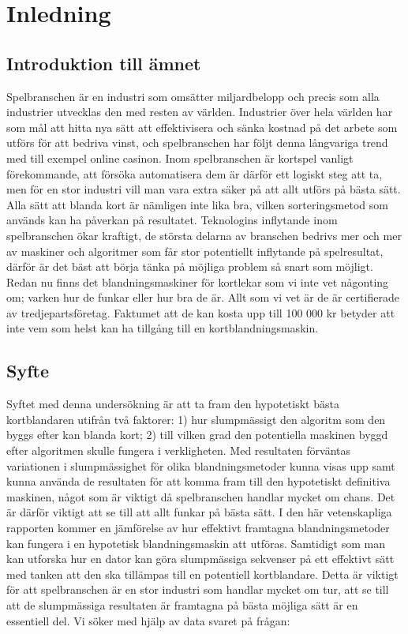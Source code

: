 \documentclass[swedish,a4paper]{article}
\begin{document}
\tableofcontents
\newpage

\section{Inledning}
\subsection{Introduktion till ämnet}

Spelbranschen är en industri som omsätter miljardbelopp och precis som alla
industrier utvecklas den med resten av världen. Industrier över hela världen har
som mål att hitta nya sätt att effektivisera och sänka kostnad på det arbete som
utförs för att bedriva vinst, och spelbranschen har följt denna långvariga trend
med till exempel online casinon. Inom spelbranschen är kortspel vanligt
förekommande, att försöka automatisera dem är därför ett logiskt steg att ta, men för
en stor industri vill man vara extra säker på att allt utförs på bästa sätt.
Alla sätt att blanda kort är nämligen inte lika bra, vilken sorteringsmetod som
används kan ha påverkan på resultatet. Teknologins inflytande inom spelbranschen
ökar kraftigt, de största delarna av branschen bedrivs mer och mer av maskiner
och algoritmer som får stor potentiellt inflytande på spelresultat, därför är
det bäst att börja tänka på möjliga problem så snart som möjligt. Redan nu finns
det blandningsmaskiner för kortlekar som vi inte vet någonting om; varken hur de
funkar eller hur bra de är. Allt som vi vet är de är certifierade av
tredjepartsföretag. Faktumet att de kan kosta upp till 100 000 kr betyder att
inte vem som helst kan ha tillgång till en kortblandningsmaskin.

\subsection{Syfte}

Syftet med denna undersökning är att ta fram den hypotetiskt bästa kortblandaren
utifrån två faktorer: 1) hur slumpmässigt den algoritm som den byggs efter kan
blanda kort; 2) till vilken grad den potentiella maskinen byggd efter algoritmen
skulle fungera i verkligheten. Med resultaten förväntas variationen i
slumpmässighet för olika blandningsmetoder kunna visas upp samt kunna använda de
resultaten för att komma fram till den hypotetiskt definitiva maskinen, något
som är viktigt då spelbranschen handlar mycket om chans. Det är därför viktigt
att se till att allt funkar på bästa sätt. I den här vetenskapliga rapporten
kommer en jämförelse av hur effektivt framtagna blandningsmetoder kan fungera i
en hypotetisk blandningsmaskin att utföras. Samtidigt som man kan utforska hur
en dator kan göra slumpmässiga sekvenser på ett effektivt sätt med tanken att
den ska tillämpas till en potentiell kortblandare. Detta är viktigt för att
spelbranschen är en stor industri som handlar mycket om tur, att se till att de
slumpmässiga resultaten är framtagna på bästa möjliga sätt är en essentiell del.
Vi söker med hjälp av data svaret på frågan:
\end{document}
